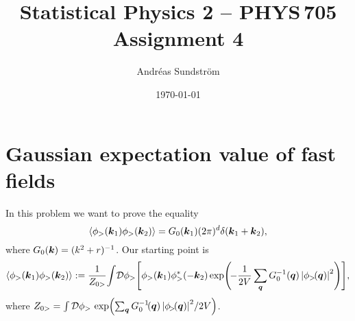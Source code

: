 \documentclass[11pt,letter, swedish, english
]{article}
\begin{document}




\title{Statistical Physics 2 -- PHYS\,705 \\
Assignment 4}
\author{Andréas Sundström}
\date{\today}

\maketitle


\section{Gaussian expectation value of fast fields}
In this problem we want to prove the equality
\begin{equation}\label{eq:1_want}
\ev{\phi_>(\vb*k_1)\phi_>(\vb*k_2)}
= G_0(\vb*k_1) (2\pi)^d \delta(\vb*k_1+\vb*k_2),
\end{equation}
where $G_0(\vb*k) = (k^2+r)^{-1}$. Our starting point is
\begin{equation}\label{eq:1_start}
\ev{\phi_>(\vb*k_1)\phi_>(\vb*k_2)}
:= \frac{1}{Z_{0>}}\! \int\!\mathcal{D}\phi_> 
\qty[\phi_>(\vb*k_1)\phi_>^*(-\vb*k_2)
\exp(\!{-}\frac{1}{2V}\sum_{\vb*q}G_0^{-1}(\vb*q)\,
\qty|\phi_{>}\!(\vb*q)|^2
)],
\end{equation}
where $Z_{0>} = \int\mathcal{D}\phi_>\,
\exp(\sum_{\vb*q}G_0^{-1}\!(\vb*q)\,
\qty|\phi_{\!>}\!(\vb*q)|^2/2V)$.
\end{document}
